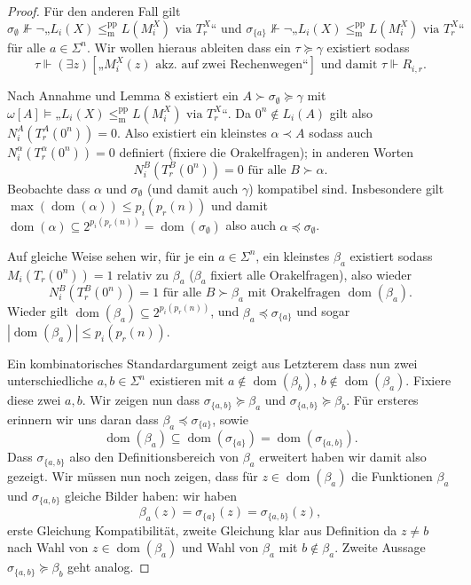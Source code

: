 \documentclass[nofonts]{uebung}
\theoremstyle{definition}
\DeclareMathOperator{\dom}{dom}
\def\leqmpp{\ensuremath{\leq_\mathrm{m}^\mathrm{pp}}}
\begin{document}
\begin{proof}
    Für den anderen Fall gilt 
    \[ \sigma_\emptyset \not\Vdash \neg„L_{i}(X)\leqmpp L(M_i^X)\text{ via }T^X_r“ \text{ und }\sigma_{\{a\}} \not\Vdash \neg„L_{i}(X)\leqmpp L(M_i^X)\text{ via }T^X_r“ \]
    für alle $a\in\Sigma^n$.
    Wir wollen hieraus ableiten dass ein $\tau\succeq\gamma$ existiert sodass
    \[ \tau\Vdash (\exists z)[\text{„$M_i^X(z)$ akz. auf zwei Rechenwegen“}] \text{ und damit } \tau\Vdash  R_{i,r}. \]

    Nach Annahme und Lemma 8 existiert ein $A\succ\sigma_\emptyset\succeq \gamma$ mit $\omega[A] \vDash „L_{i}(X)\leqmpp L(M_i^X)\text{ via }T^X_r“$.
    Da $0^n\not\in L_i(A)$ gilt also $N^A_i(T_r^A(0^n))=0$.
    Also existiert ein kleinstes $\alpha\prec A$ sodass auch $N^\alpha_i(T_r^\alpha(0^n))=0$ definiert (fixiere die Orakelfragen); in anderen Worten
    \begin{equation}
        N^B_i(T_r^B(0^n))=0 \text{ für alle }B\succ\alpha.\label{eq:up-rejects}
    \end{equation}
    Beobachte dass $\alpha$ und $\sigma_\emptyset$ (und damit auch $\gamma$) kompatibel sind.
    Insbesondere gilt $\max(\dom(\alpha))\leq p_i(p_r(n))$ und damit $\dom(\alpha)\subseteq 2^{p_i(p_r(n))}=\dom(\sigma_\emptyset)$ also auch $\alpha\preceq \sigma_\emptyset$.

    Auf gleiche Weise sehen wir, für je ein $a\in\Sigma^n$, ein kleinstes $\beta_a$ existiert sodass $M_i(T_r(0^n))=1$ relativ zu $\beta_a$ ($\beta_a$ fixiert alle Orakelfragen), also wieder
    \begin{equation}
        N^B_i(T_r^B(0^n))=1 \text{ für alle $B\succ\beta_a$ mit Orakelfragen $\dom(\beta_a)$}.\label{eq:up-accepts}
    \end{equation}
    Wieder gilt $\dom(\beta_a)\subseteq 2^{p_i(p_r(n))}$, und $\beta_a\preceq \sigma_{\{a\}}$ und sogar $|\dom(\beta_a)|\leq p_i(p_r(n))$.

    Ein kombinatorisches Standardargument zeigt aus Letzterem dass nun zwei unterschiedliche $a,b\in \Sigma^n$ existieren mit $a\not\in \dom(\beta_b)$, $b\not\in \dom(\beta_a)$. Fixiere diese zwei $a,b$.
    Wir zeigen nun dass $\sigma_{\{a,b\}} \succeq \beta_a$ und $\sigma_{\{a,b\}} \succeq \beta_b$.
    Für ersteres erinnern wir uns daran dass $\beta_a\preceq\sigma_{\{a\}}$, sowie
    \[ \dom(\beta_a)\subseteq \dom(\sigma_{\{a\}})=\dom(\sigma_{\{a,b\}}). \]
    Dass $\sigma_{\{a,b\}}$ also den Definitionsbereich von $\beta_a$ erweitert haben wir damit also gezeigt. Wir müssen nun noch zeigen, dass für $z\in\dom(\beta_a)$ die Funktionen $\beta_a$ und $\sigma_{\{a,b\}}$ gleiche Bilder haben: wir haben
    \[ \beta_a(z)=\sigma_{\{a\}}(z)=\sigma_{\{a,b\}}(z), \]
    erste Gleichung Kompatibilität, zweite Gleichung klar aus Definition da $z\neq b$ nach Wahl von $z\in\dom(\beta_a)$ und Wahl von $\beta_a$ mit $b\not\in \beta_a$.
    Zweite Aussage $\sigma_{\{a,b\}} \succeq \beta_b$ geht analog.


\end{proof}
\end{document}
